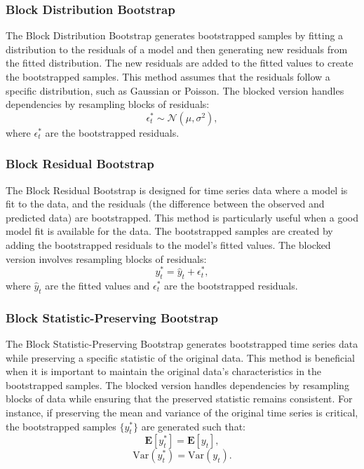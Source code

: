 \subsubsection{Block Distribution Bootstrap}
The Block Distribution Bootstrap generates bootstrapped samples by fitting a distribution to the residuals of a model and then generating new residuals from the fitted distribution. The new residuals are added to the fitted values to create the bootstrapped samples. This method assumes that the residuals follow a specific distribution, such as Gaussian or Poisson. The blocked version handles dependencies by resampling blocks of residuals:
\begin{equation}
    \epsilon_t^* \sim \mathcal{N}(\mu, \sigma^2),
\end{equation}
where \(\epsilon_t^*\) are the bootstrapped residuals.

\subsubsection{Block Residual Bootstrap}
The Block Residual Bootstrap is designed for time series data where a model is fit to the data, and the residuals (the difference between the observed and predicted data) are bootstrapped. This method is particularly useful when a good model fit is available for the data. The bootstrapped samples are created by adding the bootstrapped residuals to the model's fitted values. The blocked version involves resampling blocks of residuals:
\begin{equation}
    y_t^* = \hat{y}_t + \epsilon_t^*,
\end{equation}
where \(\hat{y}_t\) are the fitted values and \(\epsilon_t^*\) are the bootstrapped residuals.

\subsubsection{Block Statistic-Preserving Bootstrap}
The Block Statistic-Preserving Bootstrap generates bootstrapped time series data while preserving a specific statistic of the original data. This method is beneficial when it is important to maintain the original data's characteristics in the bootstrapped samples. The blocked version handles dependencies by resampling blocks of data while ensuring that the preserved statistic remains consistent. For instance, if preserving the mean and variance of the original time series is critical, the bootstrapped samples \( \{ y_t^* \} \) are generated such that:
\begin{equation}
    \mathbf{E}[y_t^*] = \mathbf{E}[y_t],
\end{equation}
\begin{equation}
    \text{Var}(y_t^*) = \text{Var}(y_t).
\end{equation}


